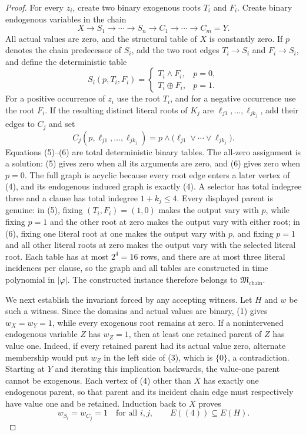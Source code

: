 \documentclass{article}
\begin{document}
\begin{proof}
For every \(z_i\), create two binary exogenous roots \(T_i\) and \(F_i\).  Create binary endogenous variables in the chain
\[
 X\longrightarrow S_1\longrightarrow\cdots\longrightarrow S_n
 \longrightarrow C_1\longrightarrow\cdots\longrightarrow C_m=Y.                  \tag{4}
\]
All actual values are zero, and the structural table of \(X\) is constantly zero.  If \(p\) denotes the chain predecessor of \(S_i\), add the two root edges \(T_i\to S_i\) and \(F_i\to S_i\), and define the deterministic table
\[
 S_i(p,T_i,F_i)=
 \begin{cases}
 T_i\wedge F_i,&p=0,\\
 T_i\mathbin\oplus F_i,&p=1.
 \end{cases}                                                                       \tag{5}
\]
For a positive occurrence of \(z_i\) use the root \(T_i\), and for a negative occurrence use the root \(F_i\).  If the resulting distinct literal roots of \(K_j\) are \(\ell_{j1},\ldots,\ell_{jk_j}\), add their edges to \(C_j\) and set
\[
 C_j(p,\ell_{j1},\ldots,\ell_{jk_j})
 =p\wedge\bigl(\ell_{j1}\vee\cdots\vee\ell_{jk_j}\bigr).                       \tag{6}
\]
Equations (5)--(6) are total deterministic binary tables.  The all-zero assignment is a solution: (5) gives zero when all its arguments are zero, and (6) gives zero when \(p=0\).  The full graph is acyclic because every root edge enters a later vertex of (4), and its endogenous induced graph is exactly (4).  A selector has total indegree three and a clause has total indegree \(1+k_j\le4\).  Every displayed parent is genuine: in (5), fixing \((T_i,F_i)=(1,0)\) makes the output vary with \(p\), while fixing \(p=1\) and the other root at zero makes the output vary with either root; in (6), fixing one literal root at one makes the output vary with \(p\), and fixing \(p=1\) and all other literal roots at zero makes the output vary with the selected literal root.  Each table has at most \(2^4=16\) rows, and there are at most three literal incidences per clause, so the graph and all tables are constructed in time polynomial in \(|\varphi|\).  The constructed instance therefore belongs to \(\mathfrak M_{\mathrm{chain}}\).

We next establish the invariant forced by any accepting witness.  Let \(H\) and \(w\) be such a witness.  Since the domains and actual values are binary, (1) gives \(w_X=w_Y=1\), while every exogenous root remains at zero.  If a nonintervened endogenous variable \(Z\) has \(w_Z=1\), then at least one retained parent of \(Z\) has value one.  Indeed, if every retained parent had its actual value zero, alternate membership would put \(w_Z\) in the left side of (3), which is \(\{0\}\), a contradiction.  Starting at \(Y\) and iterating this implication backwards, the value-one parent cannot be exogenous.  Each vertex of (4) other than \(X\) has exactly one endogenous parent, so that parent and its incident chain edge must respectively have value one and be retained.  Induction back to \(X\) proves
\[
 w_{S_i}=w_{C_j}=1\quad\text{for all \(i,j\)},
 \qquad E((4))\subseteq E(H).                                                       \tag{7}
\]


\end{proof}
\end{document}
